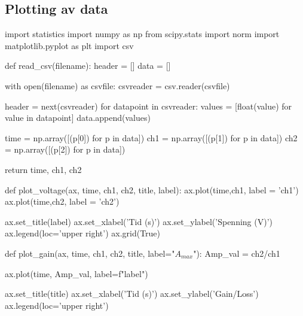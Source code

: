 \subsection{Plotting av data}
\begin{pythoncode}
import statistics 
import numpy as np
from scipy.stats import norm
import matplotlib.pyplot as plt
import csv

def read_csv(filename):
    header = []
    data = []

    with open(filename) as csvfile:
        csvreader = csv.reader(csvfile)
    
        header = next(csvreader)
        for datapoint in csvreader:
            values = [float(value) for value in datapoint]
            data.append(values)

    time = np.array([(p[0]) for p in data])
    ch1 = np.array([(p[1]) for p in data])
    ch2 = np.array([(p[2]) for p in data])

    return time, ch1, ch2

def plot_voltage(ax, time, ch1, ch2, title, label):
    ax.plot(time,ch1, label = 'ch1')
    ax.plot(time,ch2, label = 'ch2')

    ax.set_title(label)
    ax.set_xlabel('Tid (s)')
    ax.set_ylabel('Spenning (V)')
    ax.legend(loc='upper right')
    ax.grid(True)

def plot_gain(ax, time, ch1, ch2, title, label="$A_{max}$"):
    Amp_val = ch2/ch1
    
    ax.plot(time, Amp_val, label=f"{label}")
    
    ax.set_title(title)
    ax.set_xlabel('Tid (s)')
    ax.set_ylabel('Gain/Loss')
    ax.legend(loc='upper right')
\end{pythoncode}
